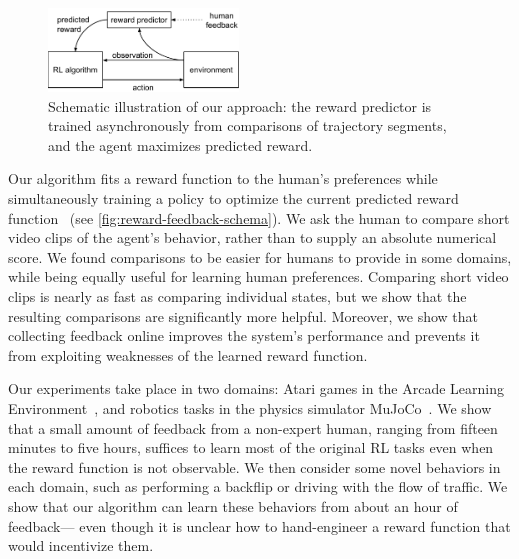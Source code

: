 \documentclass{article}
\begin{document}
\begin{figure}
\begin{center}
\includegraphics[width=0.45\textwidth]{setup.pdf}
\end{center}
\caption{Schematic illustration of our approach:
the reward predictor is trained asynchronously from comparisons of trajectory segments,
and the agent maximizes predicted reward.}
\label{fig:reward-feedback-schema}
\end{figure}

Our algorithm fits a reward function to the human's preferences
while simultaneously training a policy to optimize the current predicted reward function%
~(see \autoref{fig:reward-feedback-schema}).
We ask the human to compare short video clips of the agent's behavior,
rather than to supply an absolute numerical score.
We found comparisons to be easier for humans to provide in some domains,
while being equally useful for learning human preferences.
Comparing short video clips is nearly as fast as comparing individual states,
but we show that the resulting comparisons are significantly more helpful.
Moreover, we show that collecting feedback online improves the system's performance and
prevents it from exploiting weaknesses of the learned reward function.

Our experiments take place in two domains:
Atari games in the Arcade Learning Environment~\citep{Bellemare13},
and robotics tasks in the physics simulator MuJoCo~\citep{Todorov12}.
We show that a small amount of feedback from a non-expert human,
ranging from fifteen minutes to five hours,
suffices to learn most of the original RL tasks even when the reward function is not observable.
We then consider some novel behaviors in each domain,
such as performing a backflip or driving with the flow of traffic.
We show that our algorithm can learn these behaviors from about an hour of feedback---%
even though it is unclear how to hand-engineer a reward function that would incentivize them.
\end{document}

